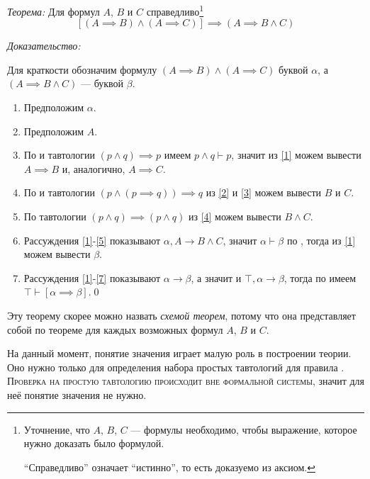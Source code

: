 {\it Теорема:} Для формул $A$, $B$ и $C$ справедливо\footnote[][3mm]{
	Уточнение, что $A$, $B$, $C$ --- формулы необходимо, чтобы выражение, которое
	нужно доказать было формулой.

	``Справедливо'' означает ``истинно'', то есть доказуемо из аксиом.
}
\[
	[(A\implies B)\land (A\implies C)]\implies (A\implies B\land C)
\]

{\it Доказательство:}

Для краткости обозначим формулу
${(A\implies B)\land (A\implies C)}$ буквой $\alpha$,
а $(A\implies B\land C)$ --- буквой $\beta$.

\begin{enumerate}[label=(\arabic*)]
	\item{}\label{1}Предположим $\alpha$.

	\item{}\label{2}Предположим $A$.

	\item{}\label{3}По \taut{} и тавтологии $(p\land q)\implies p$ имеем
	$p\land q\vdash p$, значит из \ref{1} можем вывести
	$A\implies B$ и, аналогично, $A\implies C$.

	\item{}\label{4}По \taut{} и тавтологии ${(p\land (p\implies q))\implies q}$
	из \ref{2} и \ref{3} можем вывести $B$ и $C$.

	\item{}\label{5}По тавтологии $(p\land q)\implies(p\land q)$
	из \ref{4} можем вывести $B\land C$.

	\item{}\label{6}Рассуждения \ref{1}-\ref{5} показывают
	$\alpha,A\to B\land C$, значит $\alpha\vdash \beta$ по \implic{},
	тогда из \ref{1} можем вывести $\beta$.

	\item{}\label{7}
	Рассуждения \ref{1}-\ref{7} показывают $\alpha\to\beta$,
	а значит и $\top,\alpha\to\beta$, тогда по \implic{}
	имеем $\top\vdash [\alpha\implies\beta]$.\qed
\end{enumerate}

Эту теорему скорее можно назвать {\it схемой теорем}, потому что она представляет
собой по теореме для каждых возможных формул $A$, $B$ и $C$.

На данный момент, понятие значения играет малую роль в построении теории.
Оно нужно только для определения набора простых тавтологий для правила \taut{}.
\textsc{Проверка на простую тавтологию
	происходит вне формальной системы}, значит для неё понятие значения не нужно.

